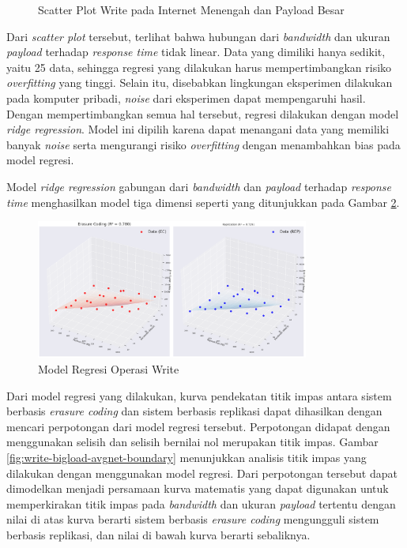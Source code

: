 \begin{enumerate}
\begin{figure}[ht]
		      \caption{Scatter Plot Write pada Internet Menengah dan Payload Besar}
		      \label{fig:write-bigload-avgnet-scatter}
	      \end{figure}

	      Dari \textit{scatter plot} tersebut, terlihat bahwa hubungan dari \textit{bandwidth} dan ukuran \textit{payload} terhadap \textit{response time} tidak linear. Data yang dimiliki hanya sedikit, yaitu 25 data, sehingga regresi yang dilakukan harus mempertimbangkan risiko \textit{overfitting} yang tinggi. Selain itu, disebabkan lingkungan eksperimen dilakukan pada komputer pribadi, \textit{noise} dari eksperimen dapat mempengaruhi hasil. Dengan mempertimbangkan semua hal tersebut, regresi dilakukan dengan model \textit{ridge regression}. Model ini dipilih karena dapat menangani data yang memiliki banyak \textit{noise} serta mengurangi risiko \textit{overfitting} dengan menambahkan bias pada model regresi.

	      Model \textit{ridge regression} gabungan dari \textit{bandwidth} dan \textit{payload} terhadap \textit{response time} menghasilkan model tiga dimensi seperti yang ditunjukkan pada Gambar \ref{fig:write-bigload-avgnet-regression}.

	      \begin{figure}[ht]
		      \centering
		      \includegraphics[width=0.8\textwidth]{resources/chapter-4/write_bigload_avgnet_regression.png}

		      \caption{Model Regresi Operasi Write}
		      \label{fig:write-bigload-avgnet-regression}
	      \end{figure}

	      Dari model regresi yang dilakukan, kurva pendekatan titik impas antara sistem berbasis \textit{erasure coding} dan sistem berbasis replikasi dapat dihasilkan dengan mencari perpotongan dari model regresi tersebut. Perpotongan didapat dengan menggunakan selisih dan selisih bernilai nol merupakan titik impas. Gambar \ref{fig:write-bigload-avgnet-boundary} menunjukkan analisis titik impas yang dilakukan dengan menggunakan model regresi. Dari perpotongan tersebut dapat dimodelkan menjadi persamaan kurva matematis yang dapat digunakan untuk memperkirakan titik impas pada \textit{bandwidth} dan ukuran \textit{payload} tertentu dengan nilai di atas kurva berarti sistem berbasis \textit{erasure coding} mengungguli sistem berbasis replikasi, dan nilai di bawah kurva berarti sebaliknya.


\end{enumerate}
